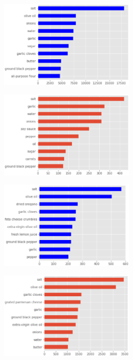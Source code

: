 \begin{center}
  \begin{minipage}{0.5\linewidth}
    \centering
    \includegraphics[width=0.5\textwidth]{pic01/cooking.eps}
  \end{minipage}
  
  \begin{minipage}{0.5\linewidth}
    \centering
    \includegraphics[width=0.5\textwidth]{pic01/filipino.eps}
  \end{minipage}
  
  \begin{minipage}{0.5\linewidth}
    \centering
      \includegraphics[width=0.5\textwidth]{pic01/greek.eps}
  \end{minipage}
  \begin{minipage}{0.5\linewidth}
    \centering
      \includegraphics[width=0.5\textwidth]{pic01/italian.eps}
  \end{minipage}
  \hfill
\end{center}

